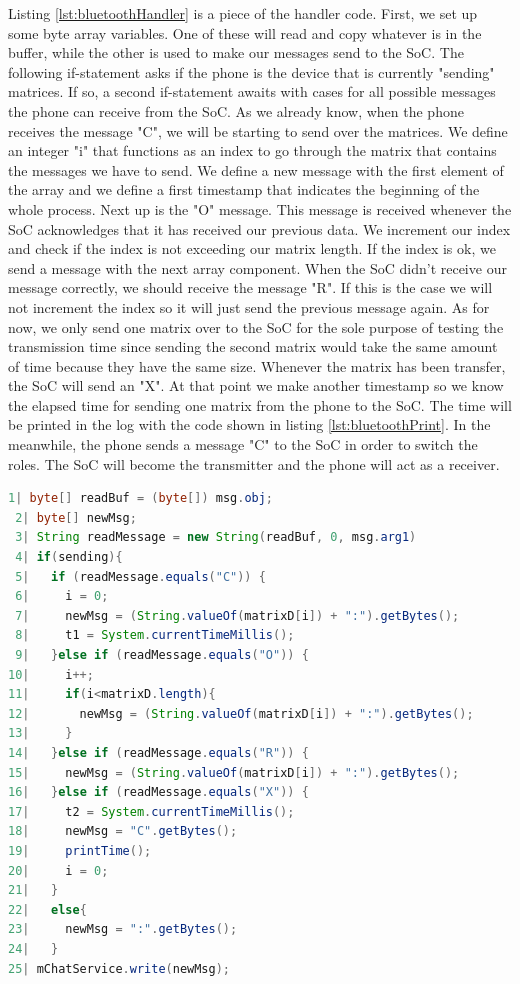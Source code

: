 \documentclass[a4paper, 11pt]{report}
\begin{document}
Listing \ref{lst:bluetoothHandler} is a piece of the handler code. First, we set up some byte array variables. One of these will read and copy whatever is in the buffer, while the other is used to make our messages send to the SoC. The following if-statement asks if the phone is the device that is currently "sending" matrices. If so, a second if-statement awaits with cases for all possible messages the phone can receive from the SoC. As we already know, when the phone receives the message "C", we will be starting to send over the matrices. We define an integer "i" that functions as an index to go through the matrix that contains the messages we have to send. We define a new message with the first element of the array and we define a first timestamp that indicates the beginning of the whole process. Next up is the "O" message. This message is received whenever the SoC acknowledges that it has received our previous data. We increment our index and check if the index is not exceeding our matrix length. If the index is ok, we send a message with the next array component. When the SoC didn't receive our message correctly, we should receive the message "R". If this is the case we will not increment the index so it will just send the previous message again. As for now, we only send one matrix over to the SoC for the sole purpose of testing the transmission time since sending the second matrix would take the same amount of time because they have the same size. Whenever the matrix has been transfer, the SoC will send an "X". At that point we make another timestamp so we know the elapsed time for sending one matrix from the phone to the SoC. The time will be printed in the log with the code shown in listing \ref{lst:bluetoothPrint}. In the meanwhile, the phone sends a message "C" to the SoC in order to switch the roles. The SoC will become the transmitter and the phone will act as a receiver.

\begin{lstlisting}[caption={Bluetooth message handler as transmitter},captionpos=b, label={lst:bluetoothHandler}, language=java, float=ht]
 1| byte[] readBuf = (byte[]) msg.obj;
 2| byte[] newMsg;
 3| String readMessage = new String(readBuf, 0, msg.arg1)
 4| if(sending){
 5|   if (readMessage.equals("C")) {
 6|     i = 0;
 7|     newMsg = (String.valueOf(matrixD[i]) + ":").getBytes();
 8|     t1 = System.currentTimeMillis();
 9|   }else if (readMessage.equals("O")) {
10|     i++;
11|     if(i<matrixD.length){
12|       newMsg = (String.valueOf(matrixD[i]) + ":").getBytes();
13|     }
14|   }else if (readMessage.equals("R")) {
15|     newMsg = (String.valueOf(matrixD[i]) + ":").getBytes();
16|   }else if (readMessage.equals("X")) {
17|     t2 = System.currentTimeMillis();
18|     newMsg = "C".getBytes();
19|     printTime();
20|     i = 0;
21|   }
22|   else{
23|     newMsg = ":".getBytes();
24|   }
25| mChatService.write(newMsg);
\end{lstlisting}
\end{document}

